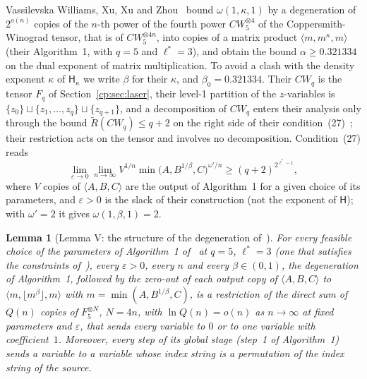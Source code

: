 \documentclass[11pt]{article}
\newtheorem{lemma}[theorem]{Lemma}
\theoremstyle{definition}
\theoremstyle{remark}
\providecommand{\eps}{\varepsilon}
\newcommand{\mat}[3]{\langle #1,#2,#3\rangle} %
\newcommand{\Hyp}{\mathsf{H}}                 %
\newcommand{\Hypk}[1]{\mathsf{H}_{#1}}        %
\newcommand{\bz}{\beta_0}                    %
\newcommand{\AlphaVXXZ}{0.321334}%
\begin{document}
Vassilevska Williams, Xu, Xu and Zhou~\cite{VXXZ24} bound $\omega(1,\kappa,1)$ by a degeneration of $2^{o(n)}$ copies of the $n$-th power of the fourth power $CW_5^{\otimes4}$ of the Coppersmith-Winograd tensor, that is of $CW_5^{\otimes4n}$, into copies of a matrix product $\mat m{m^\kappa}m$ (their Algorithm~1, with $q=5$ and $\ell^*=3$), and obtain the bound $\alpha\ge\AlphaVXXZ$ on the dual exponent of matrix multiplication. To avoid a clash with the density exponent $\kappa$ of $\Hypk\kappa$ we write $\beta$ for their $\kappa$, and $\bz=\AlphaVXXZ$. Their $CW_q$ is the tensor $F_q$ of Section~\ref{cp:sec:laser}, their level-1 partition of the $z$-variables is $\{z_0\}\sqcup\{z_1,\dots,z_q\}\sqcup\{z_{q+1}\}$, and a decomposition of $CW_q$ enters their analysis only through the bound $\tilde R(CW_q)\le q+2$ on the right side of their condition~(27)~\cite[Sections~3.6, 3.7 and~8]{VXXZ24}; their restriction acts on the tensor and involves no decomposition. Condition~(27) reads
\[
\lim_{\eps\to0}\lim_{n\to\infty}V^{1/n}\min\bigl(A,B^{1/\beta},C\bigr)^{\omega'/n}\ge(q+2)^{2^{\ell^*-1}},
\]
where $V$ copies of $\mat ABC$ are the output of Algorithm~1 for a given choice of its parameters, and $\eps>0$ is the slack of their construction (not the exponent of $\Hyp$); with $\omega'=2$ it gives $\omega(1,\beta,1)=2$.

\begin{lemma}[Lemma V: the structure of the degeneration of~\cite{VXXZ24}]\label{cp:C18}
For every feasible choice of the parameters of Algorithm~1 of~\cite{VXXZ24} at $q=5$, $\ell^*=3$ (one that satisfies the constraints of~\cite[Theorems~5.3, 6.1 and~6.3]{VXXZ24}), every $\eps>0$, every $n$ and every $\beta\in(0,1)$, the degeneration of Algorithm~1, followed by the zero-out of each output copy of $\mat ABC$ to $\mat m{\lfloor m^\beta\rfloor}m$ with $m=\min(A,B^{1/\beta},C)$, is a restriction of the direct sum of $Q(n)$ copies of $F_5^{\otimes N}$, $N=4n$, with $\ln Q(n)=o(n)$ as $n\to\infty$ at fixed parameters and $\eps$, that sends every variable to $0$ or to one variable with coefficient~$1$. Moreover, every step of its global stage (step~1 of Algorithm~1) sends a variable to a variable whose index string is a permutation of the index string of the source.
\end{lemma}
\end{document}
